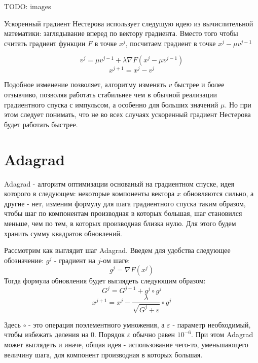 \documentclass[12pt]{report}
\begin{document}
    {TODO: images}

    Ускоренный градиент Нестерова использует следущую идею из вычислительной
    математики: заглядывание вперед по вектору градиента. Вместо того чтобы считать
    градиент функции $F$ в точке $x^j$, посчитаем градиент в точке $x^j - \mu v^{j-1}$

    \begin{equation}
      v^{j} = \mu v^{j-1} + \lambda \nabla F(x^j - \mu v^{j-1})
    \end{equation}
    \begin{equation}
      x^{j+1} = x^j- v^j
    \end{equation}

    Подобное изменение позволяет, алгоритму изменять $v$ быстрее и более отзывчиво,
    позволяя работать стабильнее чем в обычной реализации градиентного спуска с
    импульсом, а особенно для больших значений $\mu$. Но при этом следует понимать,
    что не во всех случаях ускоренный градиент Нестерова будет работать быстрее.

  \section{Adagrad}
    Adagrad - алгоритм оптимизации основаный на градиентном спуске, идея которого
    в следующем: некоторые компоненты вектора $x$ обновляются сильно, а другие -
    нет, изменим формулу для шага градиентного спуска таким образом, чтобы шаг по
    компонентам производная в которых большая, шаг становился меньше, чем по тем,
    в которых производная близка нулю. Для этого будем хранить сумму квадратов
    обновлений.

    Рассмотрим как выглядит шаг Adagrad. Введем для удобства следующее обозначение:
    $g^j$ - градиент на $j$-ом шаге:
    $$g^j=\nabla F(x^j)$$
    Тогда формула обновления будет выглядеть следующим образом:
    \begin{equation}
      G^j = G^{j-1} + g^j \circ g^j
    \end{equation}
    \begin{equation}
      x^{j+1} = x^j - \frac{\lambda}{\sqrt{G^j+\varepsilon}} \circ g^j
    \end{equation}

    Здесь $\circ$ - это операция поэлементного умножения, а $\varepsilon$ - параметр
    необходимый, чтобы избежать деления на $0$. Порядок $\varepsilon$ обычно равен
    $10^{-6}$. При этом Adagrad может выглядеть и иначе, общая идея - использование
    чего-то, уменьшающего величину шага, для компонент производная в которых большая.
\end{document}
